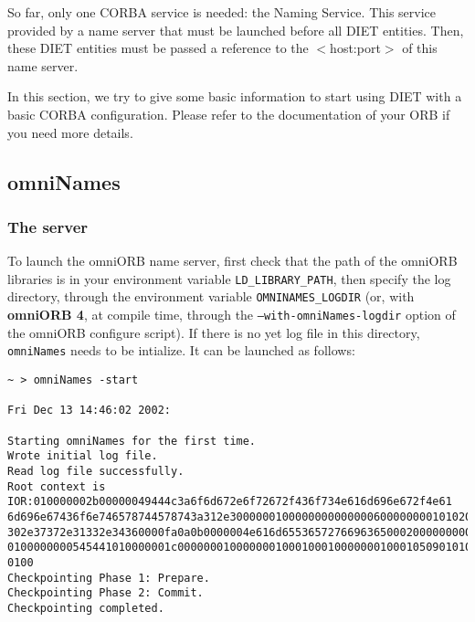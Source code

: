 So far, only one CORBA service is needed: the Naming Service. This
service provided by a name server that must be launched before all
DIET entities. Then, these DIET entities must be passed a reference to
the $<$host:port$>$ of this name server.

In this section, we try to give some basic information to start using DIET with
a basic CORBA configuration. Please refer to the documentation of your ORB if
you need more details.

\subsection{omniNames}

\subsubsection{The server}

To launch the omniORB name server, first check that the path of the omniORB
libraries is in your environment variable \texttt{LD\_LIBRARY\_PATH}, then
specify the log directory, through the environment variable
\texttt{OMNINAMES\_LOGDIR} (or, with \textbf{omniORB 4}, at compile time,
through the \texttt{--with-omniNames-logdir} option of the omniORB configure
script). If there is no yet log file in this directory, \texttt{omniNames} needs to be intialize. It can be launched as follows:
{\footnotesize
\begin{verbatim}
~ > omniNames -start

Fri Dec 13 14:46:02 2002:

Starting omniNames for the first time.
Wrote initial log file.
Read log file successfully.
Root context is IOR:010000002b00000049444c3a6f6d672e6f72672f436f734e616d696e672f4e61
6d696e67436f6e746578744578743a312e300000010000000000000060000000010102000d0000003134
302e37372e31332e34360000fa0a0b0000004e616d655365727669636500020000000000000008000000
0100000000545441010000001c0000000100000001000100010000000100010509010100010000000901
0100
Checkpointing Phase 1: Prepare.
Checkpointing Phase 2: Commit.
Checkpointing completed.
\end{verbatim}
}

